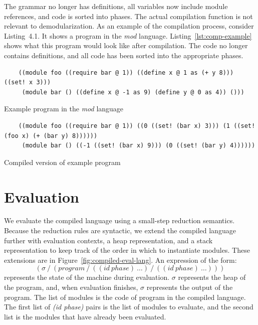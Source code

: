 The grammar no longer has definitions, all variables now include module references, and code is sorted into phases.
The actual compilation function is not relevant to demodularization.
As an example of the compilation process, consider Listing~4.1.
It shows a program in the \emph{mod} language.
Listing~\ref{lst:comp-example} shows what this program would look like after compilation.
The code no longer contains definitions, and all code has been sorted into the appropriate phases.
\begin{listing}
  \begin{verbatim}
    ((module foo ((require bar @ 1)) ((define x @ 1 as (+ y 8))) ((set! x 3)))
     (module bar () ((define x @ -1 as 9) (define y @ 0 as 4)) ()))
  \end{verbatim}
  \label{lst:exp-example}
  \caption{Example program in the \emph{mod} language}
\end{listing}

\begin{listing}
  \begin{verbatim}
    ((module foo ((require bar @ 1)) ((0 ((set! (bar x) 3))) (1 ((set! (foo x) (+ (bar y) 8))))))
     (module bar () ((-1 ((set! (bar x) 9))) (0 ((set! (bar y) 4))))))
  \end{verbatim}
  \label{lst:comp-example}
  \caption{Compiled version of example program}
\end{listing}

\section{Evaluation}

We evaluate the compiled language using a small-step reduction semantics. 
Because the reduction rules are syntactic, we extend the compiled language further with evaluation contexts, a heap representation, and a stack representation to keep track of the order in which to instantiate modules.
These extensions are in Figure~\ref{fig:compiled-eval-lang}.
An expression of the form:
\[
  (\sigma\ /\ (program\ /\ ((id\ phase)\ \ldots)\ /\ ((id\ phase)\ \ldots)))
\]
represents the state of the machine during evaluation.
$\sigma$ represents the heap of the program, and, when evaluation finishes, $\sigma$ represents the output of the program.
The list of modules is the code of program in the compiled language.
The first list of \emph{(id phase)} pairs is the list of modules to evaluate, and the second list is the modules that have already been evaluated.

